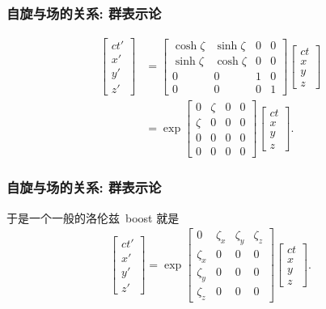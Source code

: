 \documentclass[aspectratio=169, 10pt, utf8, mathserif]{beamer}
\numberwithin{equation}{section} %
\numberwithin{figure}{section} %
\begin{document}
\begin{frame}
\frametitle{\textsc{自旋与场的关系: 群表示论}}

\begin{align}
\left[
\begin{array}{l}
ct'\\x'\\y'\\z'
\end{array}
\right]&=
\left[
\begin{array}{cccc}
\cosh\zeta&\sinh\zeta&0&0\\
\sinh\zeta&\cosh\zeta&0&0\\
0&0&1&0\\
0&0&0&1
\end{array}
\right]
\left[
\begin{array}{l}
ct\\x\\y\\z
\end{array}
\right]\nonumber\\
&=\exp\left[
\begin{array}{cccc}
0&\zeta&0&0\\
\zeta&0&0&0\\
0&0&0&0\\
0&0&0&0
\end{array}
\right]
\left[
\begin{array}{l}
ct\\x\\y\\z
\end{array}
\right].\nonumber
\end{align}


\end{frame}



\begin{frame}
\frametitle{\textsc{自旋与场的关系: 群表示论}}

于是一个一般的洛伦兹~boost 就是
\begin{align}
\left[
\begin{array}{l}
ct'\\x'\\y'\\z'
\end{array}
\right]
=\exp\left[
\begin{array}{cccc}
0&\zeta_x&\zeta_y&\zeta_z\\
\zeta_x&0&0&0\\
\zeta_y&0&0&0\\
\zeta_z&0&0&0
\end{array}
\right]
\left[
\begin{array}{l}
ct\\x\\y\\z
\end{array}
\right].
\end{align}
\end{frame}
\end{document}
